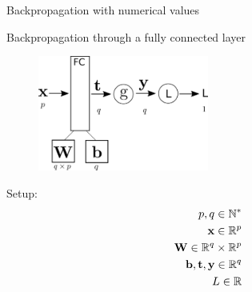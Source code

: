\documentclass[handout,xcolor=pdftex,dvipsnames,table,mathserif]{beamer}
\begin{document}
\begin{frame}{Backpropagation with numerical values}

\end{frame}


\begin{frame}{Backpropagation through a fully connected layer}
\begin{figure}
\includegraphics[width=0.5\textwidth]{bp_fc.png}
\end{figure}

Setup:
\begin{eqnarray*}
p, q \in \mathbb{N}^*\\
\mathbf{x} \in \mathbb{R}^p \\
\mathbf{W} \in \mathbb{R}^q \times \mathbb{R}^p \\
\mathbf{b}, \mathbf{t}, \mathbf{y} \in \mathbb{R}^q \\
L \in \mathbb{R}
\end{eqnarray*}

\end{frame}
\end{document}
